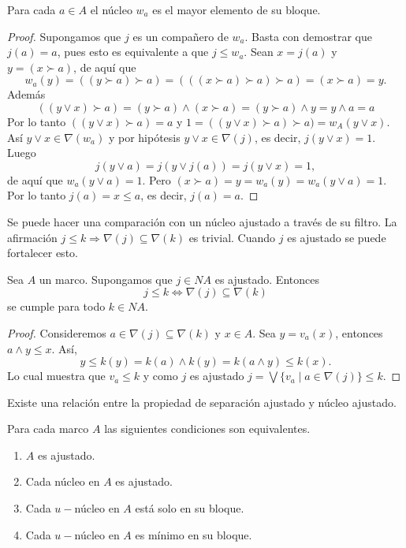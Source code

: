 \begin{lem}\label{Lema5.5.8}
    Para cada $a\in A$ el núcleo $w_a$ es el mayor elemento de su bloque.
\end{lem}

\begin{proof}
    Supongamos que $j$ es un compañero de $w_a$. Basta con demostrar que $j(a)=a$, pues esto es equivalente a que $j\leq w_a$. Sean $x=j(a)$ y $y=(x\succ a)$, de aquí que 
    \[
    w_a(y)=((y\succ a)\succ a)=(((x\succ a)\succ a)\succ a)=(x\succ a)=y.
    \]
    Además
    \[
    ((y\vee x)\succ a)=(y\succ a)\wedge (x\succ a)=(y\succ a)\wedge y=y\wedge a=a
    \]
    Por lo tanto $((y\vee x)\succ a)=a$ y $1=((y\vee x)\succ a)\succ a)=w_A(y\vee x)$. Así $y\vee x\in \nabla(w_a)$ y por hipótesis $y\vee x\in \nabla (j)$, es decir, $j(y\vee x)=1$.\\
    Luego 
    \[
    j(y\vee a)=j(y\vee j(a))=j(y\vee x)=1,
    \]
    de aquí que $w_a(y\vee a)=1$. Pero $(x\succ a)=y=w_a(y)=w_a(y\vee a)=1$. Por lo tanto $j(a)=x\leq a$, es decir, $j(a)=a$.
\end{proof}

Se puede hacer una comparación con un núcleo ajustado a través de su filtro. La afirmación $j\leq k\Rightarrow \nabla(j)\subseteq \nabla(k)$ es trivial. Cuando $j$ es ajustado se puede fortalecer esto.

\begin{lem}\label{Lema5.5.9}
    Sea $A$ un marco. Supongamos que $j\in NA$ es ajustado. Entonces 
    \[
    j\leq k\Leftrightarrow \nabla(j)\subseteq \nabla(k)
    \]
    se cumple para todo $k\in NA$.
\end{lem}

\begin{proof}
    Consideremos $a\in \nabla(j)\subseteq \nabla(k)$ y $x\in A$. Sea $y=v_a(x)$, entonces $a\wedge y\leq x$. Así, 
    \[
    y\leq k(y)=k(a)\wedge k(y)=k(a\wedge y)\leq k(x).
    \]
    Lo cual muestra que $v_a\leq k$ y como $j$ es ajustado $j=\bigvee\{v_a\mid a\in \nabla(j)\}\leq k$.
\end{proof}

Existe una relación entre la propiedad de separación ajustado y núcleo ajustado.

\begin{thm}\label{Teorema5.5.10}
    Para cada marco $A$ las siguientes condiciones son equivalentes.
    \begin{enumerate}[$i) $]
        \item $A$ es ajustado.
        \item Cada núcleo en $A$ es ajustado.
        \item Cada $u-$núcleo en $A$ está solo en su bloque.
        \item Cada $u-$núcleo en $A$ es mínimo en su bloque.
    \end{enumerate}
\end{thm}

